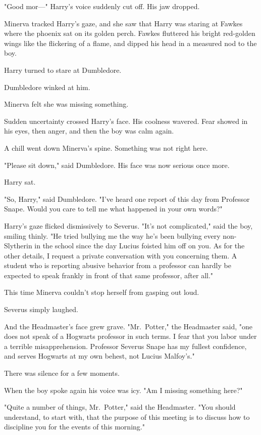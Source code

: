 "Good mor---" Harry's voice suddenly cut off. His jaw dropped.

Minerva tracked Harry's gaze, and she saw that Harry was staring at Fawkes 
where the phoenix sat on its golden perch. Fawkes fluttered his bright 
red-golden wings like the flickering of a flame, and dipped his head in a 
measured nod to the boy.

Harry turned to stare at Dumbledore.

Dumbledore winked at him.

Minerva felt she was missing something.

Sudden uncertainty crossed Harry's face. His coolness wavered. Fear showed in 
his eyes, then anger, and then the boy was calm again.

A chill went down Minerva's spine. Something was not right here.

"Please sit down," said Dumbledore. His face was now serious once more.

Harry sat.

"So, Harry," said Dumbledore. "I've heard one report of this day from Professor 
Snape. Would you care to tell me what happened in your own words?"

Harry's gaze flicked dismissively to Severus. "It's not complicated," said the 
boy, smiling thinly. "He tried bullying me the way he's been bullying every 
non-Slytherin in the school since the day Lucius foisted him off on you. As for 
the other details, I request a private conversation with you concerning them. A 
student who is reporting abusive behavior from a professor can hardly be 
expected to speak frankly in front of that same professor, after all."

This time Minerva couldn't stop herself from gasping out loud.

Severus simply laughed.

And the Headmaster's face grew grave. "Mr.~Potter," the Headmaster said, "one 
does not speak of a Hogwarts professor in such terms. I fear that you labor 
under a terrible misapprehension. Professor Severus Snape has my fullest 
confidence, and serves Hogwarts at my own behest, not Lucius Malfoy's."

There was silence for a few moments.

When the boy spoke again his voice was icy. "Am I missing something here?"

"Quite a number of things, Mr.~Potter," said the Headmaster. "You should 
understand, to start with, that the purpose of this meeting is to discuss how 
to discipline you for the events of this morning."

